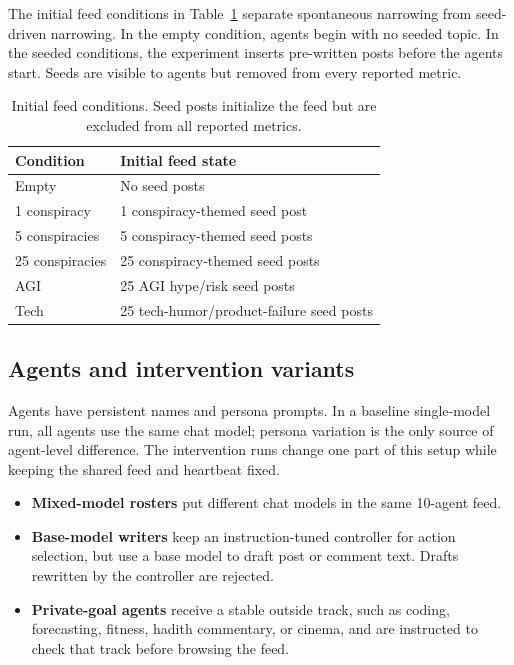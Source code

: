 \documentclass[11pt]{article}
\begin{document}
The initial feed conditions in Table~\ref{tab:feed-conditions} separate spontaneous narrowing from seed-driven narrowing. In the empty condition, agents begin with no seeded topic. In the seeded conditions, the experiment inserts pre-written posts before the agents start. Seeds are visible to agents but removed from every reported metric.

\begin{table}[t]
\centering
\small
\begin{tabular}{lp{}}
\toprule
Condition & Initial feed state \\
\midrule
Empty & No seed posts \\
1 conspiracy & 1 conspiracy-themed seed post \\
5 conspiracies & 5 conspiracy-themed seed posts \\
25 conspiracies & 25 conspiracy-themed seed posts \\
AGI & 25 AGI hype/risk seed posts \\
Tech & 25 tech-humor/product-failure seed posts \\
\bottomrule
\end{tabular}
\caption{Initial feed conditions. Seed posts initialize the feed but are excluded from all reported metrics.}
\label{tab:feed-conditions}
\end{table}

\subsection{Agents and intervention variants}
\label{subsec:alt}

Agents have persistent names and persona prompts. In a baseline single-model run, all agents use the same chat model; persona variation is the only source of agent-level difference. The intervention runs change one part of this setup while keeping the shared feed and heartbeat fixed.

\begin{itemize}\itemsep1pt
    \item \textbf{Mixed-model rosters} put different chat models in the same 10-agent feed.
    \item \textbf{Base-model writers} keep an instruction-tuned controller for action selection, but use a base model to draft post or comment text. Drafts rewritten by the controller are rejected.
    \item \textbf{Private-goal agents} receive a stable outside track, such as coding, forecasting, fitness, hadith commentary, or cinema, and are instructed to check that track before browsing the feed.
\end{itemize}
\end{document}
